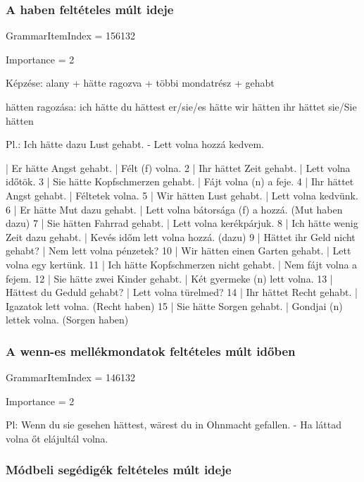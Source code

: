 \documentclass{article}
\newenvironment{desc}{\verbatim}{\endverbatim}
\newenvironment{exmp}{\verbatim}{\endverbatim}
\begin{document}
\subsubsection{A haben feltételes múlt ideje}

GrammarItemIndex = 156132

Importance = 2

\begin{desc}
Képzése:
alany + hätte ragozva + többi mondatrész + gehabt

hätten ragozása:
ich hätte
du hättest
er/sie/es hätte
wir hätten
ihr hättet
sie/Sie hätten

Pl.: Ich hätte dazu Lust gehabt. - Lett volna hozzá kedvem.
\end{desc}

\begin{exmp}
1 | Er hätte Angst gehabt. | Félt (f) volna.
2 | Ihr hättet Zeit gehabt. | Lett volna időtök.
3 | Sie hätte Kopfschmerzen gehabt. | Fájt volna (n) a feje.
4 | Ihr hättet Angst gehabt. | Féltetek volna.
5 | Wir hätten Lust gehabt. | Lett volna kedvünk.
6 | Er hätte Mut dazu gehabt. | Lett volna bátorsága (f) a hozzá. (Mut haben dazu)
7 | Sie hätten Fahrrad gehabt. | Lett volna kerékpárjuk.
8 | Ich hätte wenig Zeit dazu gehabt. | Kevés időm lett volna hozzá. (dazu)
9 | Hättet ihr Geld nicht gehabt? | Nem lett volna pénzetek?
10 | Wir hätten einen Garten gehabt. | Lett volna egy kertünk.
11 | Ich hätte Kopfschmerzen nicht gehabt. | Nem fájt volna a fejem.
12 | Sie hätte zwei Kinder gehabt. | Két gyermeke (n) lett volna.
13 | Hättest du Geduld gehabt? | Lett volna türelmed?
14 | Ihr hättet Recht gehabt. | Igazatok lett volna. (Recht haben)
15 | Sie hätte Sorgen gehabt. | Gondjai (n) lettek volna. (Sorgen haben)
\end{exmp}

\subsubsection{A wenn-es mellékmondatok feltételes múlt időben}

GrammarItemIndex = 146132

Importance = 2

\begin{desc}
Pl: Wenn du sie gesehen hättest, wärest du in Ohnmacht gefallen. - Ha láttad volna őt elájultál volna.
\end{desc}

\subsubsection{Módbeli segédigék feltételes múlt ideje}
\end{document}
